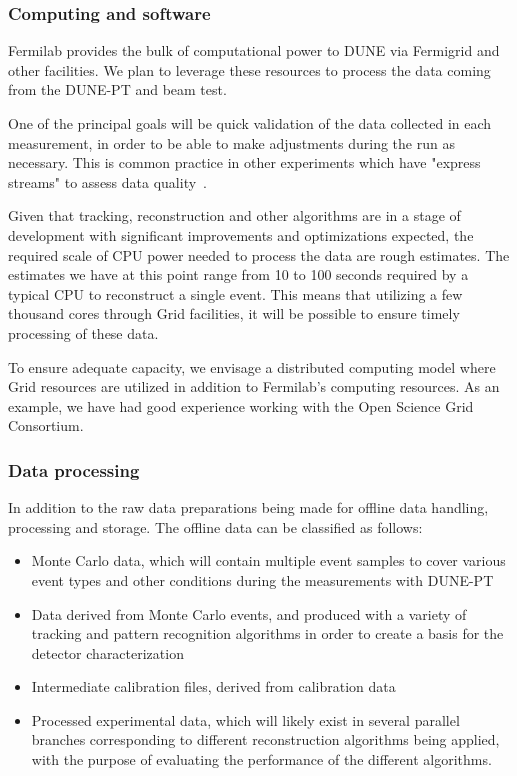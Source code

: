 \subsubsection{Computing and software}


Fermilab provides the bulk of computational power to DUNE via Fermigrid and other facilities. 
We plan to leverage these resources to process the data coming from the DUNE-PT and beam test.

One of the principal goals will be quick validation of the data collected in each measurement, in
order to be able to make adjustments during the run as necessary. 
This is common practice in other experiments which have "express streams" to assess data quality~\cite{atlas_express}.


Given that tracking, reconstruction and other algorithms are in a stage of development with significant improvements
and optimizations expected, the required scale of CPU power needed to process the data are rough estimates.
The estimates we have at this point range from 10 to 100 seconds required by a typical
CPU to reconstruct a single event. 
This means that utilizing a few thousand cores through Grid facilities, it will be possible to ensure timely processing of these data.

To ensure adequate capacity, we envisage a distributed computing model where Grid resources are utilized in addition to Fermilab's computing resources.
As an example, we have had good experience working with the Open Science Grid Consortium.


\subsubsection{Data processing}
\label{dataprocess}

In addition to the raw data preparations being made for offline data handling, processing and storage.
The offline data can be classified as follows:
\begin{itemize}
\item Monte Carlo data, which will contain multiple event samples to cover various event types and other conditions during the measurements with DUNE-PT
\item Data derived from Monte Carlo events, and produced with a variety of tracking and pattern recognition algorithms in order to create a basis for the detector characterization
\item Intermediate calibration files, derived from calibration data
\item Processed experimental data, which will likely exist in several parallel branches corresponding to different reconstruction algorithms being applied, with the purpose of evaluating the performance of the different algorithms.
\end{itemize}

